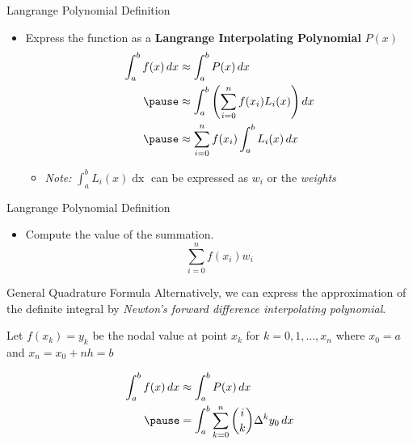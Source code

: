 \documentclass{beamer}
\begin{document}
\begin{frame}{Langrange Polynomial Definition}
    \begin{itemize}
        \item Express the function as a \textbf{Langrange Interpolating Polynomial} $P(x)$ \pause
       \begin{equation}
        \begin{aligned}
          \int_{a}^{b} f(x) \mathop{dx} &\approx \int_{a}^{b} P(x) \mathop{dx} \\ \pause
          &\approx \int_{a}^{b} \left(\sum_{i=0}^{n} f(x_i) L_i(x)\right) \mathop{dx} \\ \pause
          &\approx \sum_{i=0}^{n} f(x_i) \int_{a}^{b} L_i(x) \mathop{dx}
        \end{aligned}        
       \end{equation} \pause
       \begin{itemize}
         \item \textit{Note:} $\int_{a}^{b} L_i(x) \mathop{dx}$ can be expressed as $w_i$ or the \textit{weights}
       \end{itemize}
    \end{itemize}
\end{frame}

\begin{frame}{Langrange Polynomial Definition}
    \begin{itemize}
      \item Compute the value of the summation.
      \begin{equation} 
        \sum_{i=0}^{n} f(x_i) w_i
      \end{equation}
    \end{itemize}
\end{frame}

\begin{frame}{General Quadrature Formula \cite{general_quadrature}}
  Alternatively, we can express the approximation of the definite integral by \textit{Newton's forward difference interpolating polynomial}. \pause

  Let $f(x_k) = y_k$ be the nodal value at point $x_k$ for $k = 0,1,\dots,x_n$ where $x_0 = a$ and $x_n = x_0 + nh = b$ \pause 

      \begin{equation*}
        \begin{aligned}
          \int_{a}^{b} f(x) \mathop{dx} &\approx \int_a^b P(x) \mathop{dx} \\ \pause 
          &= \int_a^b \sum_{k=0}^n \binom{i}{k} \Delta^k y_0 \mathop{dx}
        \end{aligned}
      \end{equation*}
\end{frame}
\end{document}
